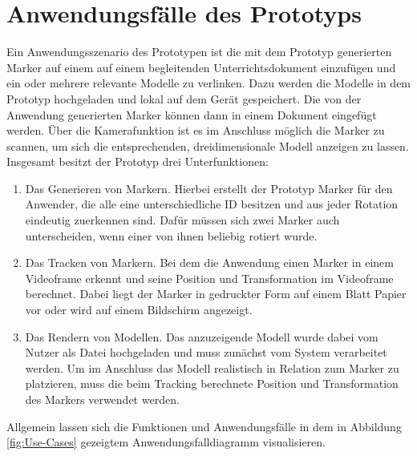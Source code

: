 \section{Anwendungsfälle des Prototyps}
Ein Anwendungsszenario des Prototypen ist die mit dem Prototyp generierten Marker auf einem auf einem begleitenden Unterrichtsdokument einzufügen und ein oder mehrere relevante Modelle zu verlinken. Dazu werden die Modelle in dem Prototyp hochgeladen und lokal auf dem Gerät gespeichert. Die von der Anwendung generierten Marker können dann in einem Dokument eingefügt werden. Über die Kamerafunktion ist es im Anschluss möglich die Marker zu scannen, um sich die entsprechenden, dreidimensionale Modell anzeigen zu lassen.\\
Insgesamt besitzt der Prototyp drei Unterfunktionen: 
\begin{enumerate}
\item Das Generieren von Markern. Hierbei erstellt der Prototyp Marker für den Anwender, die alle eine unterschiedliche ID besitzen und aus jeder Rotation eindeutig zuerkennen sind. Dafür müssen sich zwei Marker auch unterscheiden, wenn einer von ihnen beliebig rotiert wurde.
\item Das Tracken von Markern. Bei dem die Anwendung einen Marker in einem Videoframe erkennt und seine Position und Transformation im Videoframe berechnet. Dabei liegt der Marker in gedruckter Form auf einem Blatt Papier vor oder wird auf einem Bildschirm angezeigt.
\item Das Rendern von Modellen. Das anzuzeigende Modell wurde dabei vom Nutzer  als Datei hochgeladen und muss zunächst vom System verarbeitet werden. Um im Anschluss das Modell realistisch in Relation zum Marker zu platzieren, muss die beim Tracking berechnete Position und Transformation des Markers verwendet werden. 
\end{enumerate} 
Allgemein lassen sich die Funktionen und Anwendungsfälle in dem in Abbildung \ref{fig:Use-Cases} gezeigtem Anwendungsfalldiagramm visualisieren.
